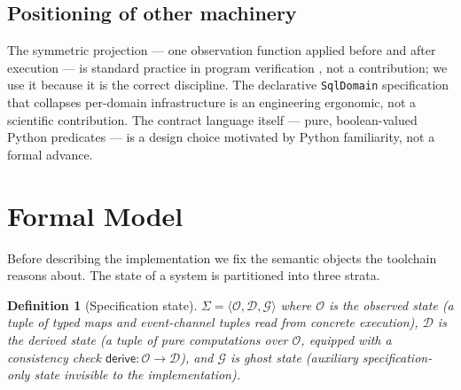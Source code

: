 \documentclass[11pt,a4paper]{article}
\newtheorem{definition}{Definition}
\begin{document}
\subsection{Positioning of other machinery}
\label{sec:contrib-positioning}

The symmetric projection --- one observation function applied before
and after execution --- is standard practice in program verification
\cite{Cousot77}, not a contribution; we use it because it is the
correct discipline.  The declarative \texttt{SqlDomain} specification
that collapses per-domain infrastructure is an engineering ergonomic,
not a scientific contribution.  The contract language itself ---
pure, boolean-valued Python predicates --- is a design choice
motivated by Python familiarity, not a formal advance.

\section{Formal Model}\label{sec:model}

Before describing the implementation we fix the semantic objects the
toolchain reasons about.  The state of a system is partitioned into
three strata.

\begin{definition}[Specification state]
$\Sigma = \langle \mathcal{O}, \mathcal{D}, \mathcal{G} \rangle$ where
$\mathcal{O}$ is the \emph{observed state} (a tuple of typed maps and
event-channel tuples read from concrete execution),
$\mathcal{D}$ is the \emph{derived state} (a tuple of pure
computations over $\mathcal{O}$, equipped with a consistency check
$\mathsf{derive}:\mathcal{O}\to\mathcal{D}$),
and $\mathcal{G}$ is \emph{ghost state} (auxiliary specification-only
state invisible to the implementation).
\end{definition}
\end{document}
